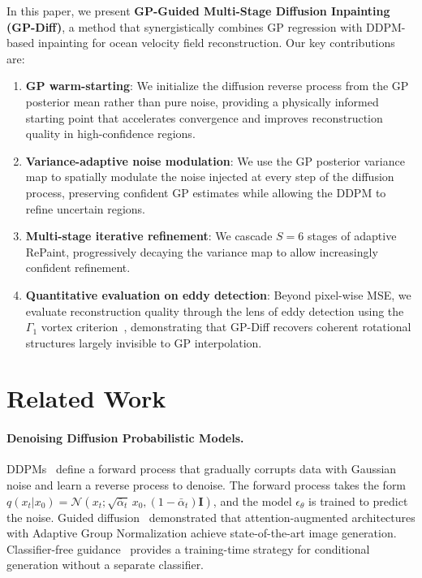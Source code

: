 \documentclass{article}
\begin{document}
In this paper, we present \textbf{GP-Guided Multi-Stage Diffusion Inpainting (GP-Diff)}, a method that synergistically combines GP regression with DDPM-based inpainting for ocean velocity field reconstruction. Our key contributions are:

\begin{enumerate}
    \item \textbf{GP warm-starting}: We initialize the diffusion reverse process from the GP posterior mean rather than pure noise, providing a physically informed starting point that accelerates convergence and improves reconstruction quality in high-confidence regions.
    \item \textbf{Variance-adaptive noise modulation}: We use the GP posterior variance map to spatially modulate the noise injected at every step of the diffusion process, preserving confident GP estimates while allowing the DDPM to refine uncertain regions.
    \item \textbf{Multi-stage iterative refinement}: We cascade $S=6$ stages of adaptive RePaint, progressively decaying the variance map to allow increasingly confident refinement.
    \item \textbf{Quantitative evaluation on eddy detection}: Beyond pixel-wise MSE, we evaluate reconstruction quality through the lens of eddy detection using the $\Gamma_1$ vortex criterion~\citep{graftieaux2001combining}, demonstrating that GP-Diff recovers coherent rotational structures largely invisible to GP interpolation.
\end{enumerate}

\section{Related Work}
\label{sec:related}

\paragraph{Denoising Diffusion Probabilistic Models.}
DDPMs~\citep{ho2020ddpm, sohl2015deep} define a forward process that gradually corrupts data with Gaussian noise and learn a reverse process to denoise. The forward process takes the form $q(x_t | x_0) = \mathcal{N}(x_t; \sqrt{\bar\alpha_t}\, x_0, (1-\bar\alpha_t)\mathbf{I})$, and the model $\epsilon_\theta$ is trained to predict the noise. Guided diffusion~\citep{dhariwal2021diffusion} demonstrated that attention-augmented architectures with Adaptive Group Normalization achieve state-of-the-art image generation. Classifier-free guidance~\citep{ho2022classifier} provides a training-time strategy for conditional generation without a separate classifier.
\end{document}
